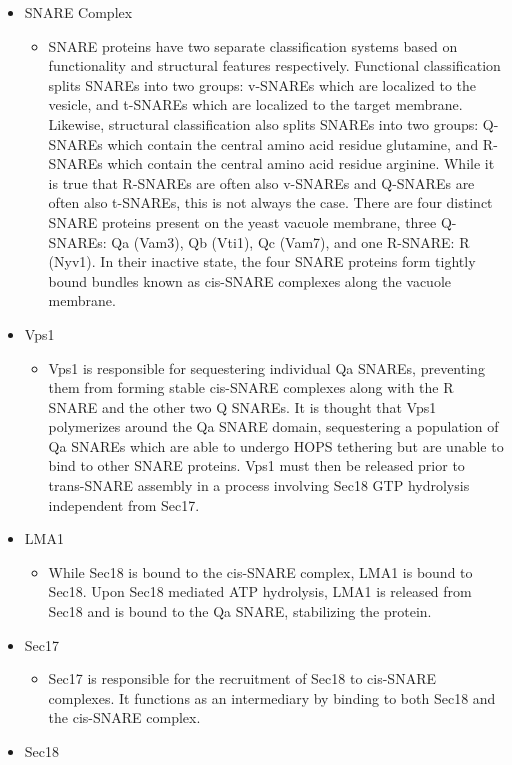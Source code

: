 \documentclass[12pt,twoside]{reedthesis}
\providecommand{\tightlist}{%
  \setlength{\itemsep}{0pt}\setlength{\parskip}{0pt}}
\begin{document}
\begin{itemize}
\tightlist
\item
  SNARE Complex

  \begin{itemize}
  \tightlist
  \item
    SNARE proteins have two separate classification systems based on functionality and structural features respectively. Functional classification splits SNAREs into two groups: v-SNAREs which are localized to the vesicle, and t-SNAREs which are localized to the target membrane. Likewise, structural classification also splits SNAREs into two groups: Q-SNAREs which contain the central amino acid residue glutamine, and R-SNAREs which contain the central amino acid residue arginine. While it is true that R-SNAREs are often also v-SNAREs and Q-SNAREs are often also t-SNAREs, this is not always the case. There are four distinct SNARE proteins present on the yeast vacuole membrane, three Q-SNAREs: Qa (Vam3), Qb (Vti1), Qc (Vam7), and one R-SNARE: R (Nyv1). In their inactive state, the four SNARE proteins form tightly bound bundles known as cis-SNARE complexes along the vacuole membrane.
  \end{itemize}
\item
  Vps1

  \begin{itemize}
  \tightlist
  \item
    Vps1 is responsible for sequestering individual Qa SNAREs, preventing them from forming stable cis-SNARE complexes along with the R SNARE and the other two Q SNAREs. It is thought that Vps1 polymerizes around the Qa SNARE domain, sequestering a population of Qa SNAREs which are able to undergo HOPS tethering but are unable to bind to other SNARE proteins. Vps1 must then be released prior to trans-SNARE assembly in a process involving Sec18 GTP hydrolysis independent from Sec17.
  \end{itemize}
\item
  LMA1

  \begin{itemize}
  \tightlist
  \item
    While Sec18 is bound to the cis-SNARE complex, LMA1 is bound to Sec18. Upon Sec18 mediated ATP hydrolysis, LMA1 is released from Sec18 and is bound to the Qa SNARE, stabilizing the protein.
  \end{itemize}
\item
  Sec17

  \begin{itemize}
  \tightlist
  \item
    Sec17 is responsible for the recruitment of Sec18 to cis-SNARE complexes. It functions as an intermediary by binding to both Sec18 and the cis-SNARE complex.
  \end{itemize}
\item
  Sec18


\end{itemize}
\end{document}
